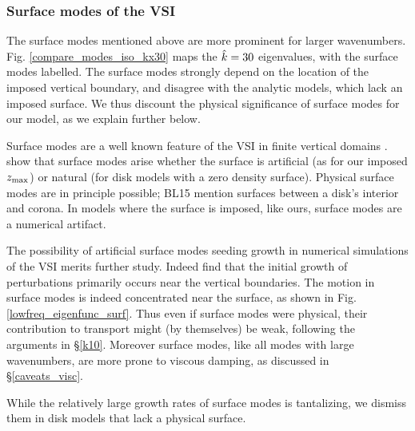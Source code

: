 \subsubsection{Surface modes of the VSI}\label{surf_comment} 
The surface modes mentioned above are more prominent for larger
wavenumbers. Fig. \ref{compare_modes_iso_kx30} maps the $\hat{k} = 30$
eigenvalues, with the surface modes labelled.  The surface modes
strongly depend on the location of the imposed vertical boundary, and
disagree with the analytic models, which lack an imposed surface. We
thus discount the physical significance of surface modes for our
model, as we explain further below.  

Surface modes are a well known feature of the VSI in finite vertical
domains .  show
that surface modes arise whether the surface is artificial (as for our
imposed $z_\mathrm{max}$) or natural (for disk models with a zero density surface).
Physical surface modes are in principle possible; BL15 mention
surfaces between a disk's interior and corona.  In models where the
surface is imposed, like ours, surface modes are a numerical
artifact. 

The possibility of artificial surface modes seeding growth in
numerical simulations of the VSI  merits further study. Indeed
 find that the initial growth of perturbations
primarily occurs near the vertical boundaries. 
The motion in surface modes is indeed concentrated near the surface,
as shown in Fig. \ref{lowfreq_eigenfunc_surf}.   
Thus even if surface modes were physical, their contribution to
transport might (by themselves) be weak,  following the arguments in 
\S\ref{k10}.  Moreover surface modes, like all modes with large
wavenumbers, are more prone to viscous damping, as discussed in
\S\ref{caveats_visc}. 

While the relatively large growth rates of surface modes is
tantalizing, we dismiss them in disk models that lack a physical
surface.  



